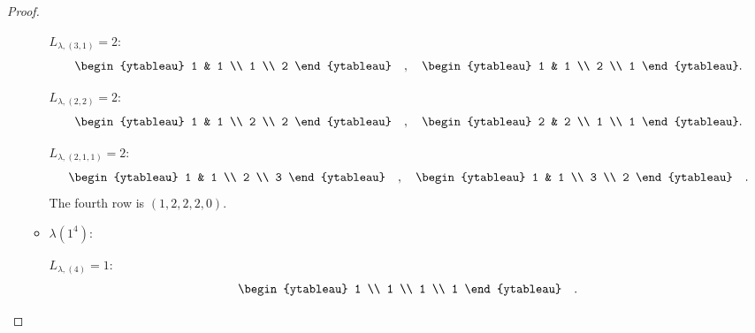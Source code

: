 \documentclass[12pt]{extarticle}
\newcommand{\<}{\langle}
\renewcommand{\>}{\rangle}
\theoremstyle{definition}
\begin{document}
\begin{proof}
\begin{enumerate}
\begin{itemize}
      $L_{\lambda, (3,1)} = 2 $:
      \begin{align*}
        \begin{ytableau}
          1 & 1 \\
          1 \\
          2
        \end{ytableau}\quad,\quad
        \begin{ytableau}
          1 & 1 \\
          2 \\
          1
        \end{ytableau}.
      \end{align*}

      $L_{\lambda, (2,2)} = 2 $:
      \begin{align*}
        \begin{ytableau}
          1 & 1 \\
          2 \\
          2
        \end{ytableau}\quad,\quad
        \begin{ytableau}
          2 & 2 \\
          1 \\
          1
        \end{ytableau}.
      \end{align*}

      $L_{\lambda, (2,1,1)} = 2 $:
      \begin{align*}
        \begin{ytableau}
          1 & 1 \\
          2 \\
          3
        \end{ytableau}\quad,\quad
        \begin{ytableau}
          1 & 1 \\
          3 \\
          2
        \end{ytableau} \quad .
      \end{align*}
      The fourth row is $(1,2,2,2,0)$.
    \item
      $\lambda(1^4)$:

      $L_{\lambda, (4)} = 1 $:
      \begin{align*}
        \begin{ytableau}
          1 \\
          1 \\
          1 \\
          1
        \end{ytableau}\quad.
      \end{align*}


\end{itemize}
\end{enumerate}
\end{proof}
\end{document}
